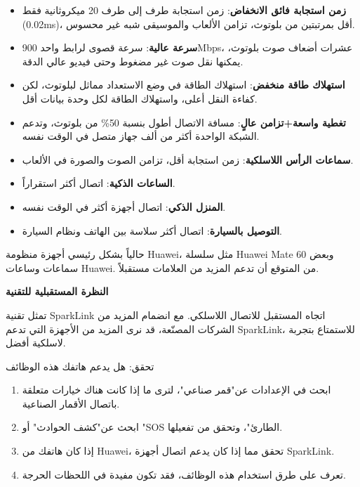 \begin{itemize}
  \item \textbf{زمن استجابة فائق الانخفاض}: زمن استجابة طرف إلى طرف 20 ميكروثانية فقط (0.02ms)، أقل بمرتبتين من بلوتوث، تزامن الألعاب والموسيقى شبه غير محسوس.
  \item \textbf{سرعة عالية}: سرعة قصوى لرابط واحد 900Mbps، عشرات أضعاف صوت بلوتوث، يمكنها نقل صوت غير مضغوط وحتى فيديو عالي الدقة.
  \item \textbf{استهلاك طاقة منخفض}: استهلاك الطاقة في وضع الاستعداد مماثل لبلوتوث، لكن كفاءة النقل أعلى، واستهلاك الطاقة لكل وحدة بيانات أقل.
  \item \textbf{تغطية واسعة+تزامن عالٍ}: مسافة الاتصال أطول بنسبة 50\% من بلوتوث، وتدعم الشبكة الواحدة أكثر من ألف جهاز متصل في الوقت نفسه.
\end{itemize}


\begin{itemize}
  \item \textbf{سماعات الرأس اللاسلكية}: زمن استجابة أقل، تزامن الصوت والصورة في الألعاب.
  \item \textbf{الساعات الذكية}: اتصال أكثر استقراراً.
  \item \textbf{المنزل الذكي}: اتصال أجهزة أكثر في الوقت نفسه.
  \item \textbf{التوصيل بالسيارة}: اتصال أكثر سلاسة بين الهاتف ونظام السيارة.
\end{itemize}


حالياً بشكل رئيسي أجهزة منظومة Huawei، مثل سلسلة Huawei Mate 60 وبعض سماعات وساعات Huawei. من المتوقع أن تدعم المزيد من العلامات مستقبلاً.

\textbf{النظرة المستقبلية للتقنية}\par

تمثل تقنية SparkLink اتجاه المستقبل للاتصال اللاسلكي. مع انضمام المزيد من الشركات المصنّعة، قد نرى المزيد من الأجهزة التي تدعم SparkLink، للاستمتاع بتجربة لاسلكية أفضل.

\begin{tcbpractice}{تحقق: هل يدعم هاتفك هذه الوظائف}
\begin{enumerate}
  \item ابحث في الإعدادات عن"قمر صناعي"، لترى ما إذا كانت هناك خيارات متعلقة باتصال الأقمار الصناعية.
  \item ابحث عن"كشف الحوادث" أو "SOS الطارئ"، وتحقق من تفعيلها.
  \item إذا كان هاتفك من Huawei، تحقق مما إذا كان يدعم اتصال أجهزة SparkLink.
  \item تعرف على طرق استخدام هذه الوظائف، فقد تكون مفيدة في اللحظات الحرجة.
\end{enumerate}

\end{tcbpractice}
